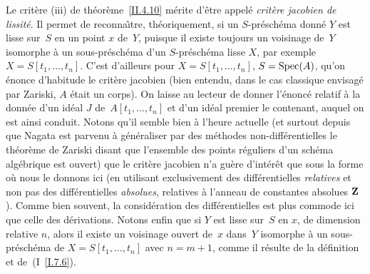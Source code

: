 \begin{remarques}
\label{II.4.14}
Le crit\`ere (iii) de th\'eor\`eme~\ref{II.4.10} m\'erite
d'\^etre appel\'e \emph{critère jacobien de lissité}.
Il permet de reconna\^{\i}tre, th\'eoriquement, si un
$S$-pr\'esch\'ema donn\'e $Y$ est lisse sur~$S$ en un point $x$
de~$Y$, puisque il existe toujours un voisinage de~$Y$ isomorphe \`a
un sous-pr\'esch\'ema d'un $S$-pr\'esch\'ema lisse $X$, par
exemple $X=S[t_1,\dots,t_n]$. C'est d'ailleurs pour
$X=S[t_1,\dots,t_n]$, $S=\operatorname{Spec}(A)$, qu'on \'enonce d'habitude le
crit\`ere jacobien (bien
entendu, dans le cas classique envisag\'e par Zariski, $A$ \'etait
un corps). On laisse au lecteur de donner l'\'enonc\'e relatif
\`a la donn\'ee d'un id\'eal $J$ de~$A[t_1,\dots,t_n]$ et d'un
id\'eal premier le contenant, auquel on est ainsi conduit. Notons
qu'il semble bien \`a l'heure actuelle (et surtout depuis que Nagata
est parvenu \`a g\'en\'eraliser par des m\'ethodes
non-diff\'erentielles le th\'eor\`eme de Zariski disant que
l'ensemble des points r\'eguliers d'un sch\'ema alg\'ebrique est
ouvert) que le crit\`ere jacobien n'a gu\`ere d'int\'er\^et
que sous la forme o\`u nous le donnons ici (\ie en utilisant
exclusivement des diff\'erentielles \emph{relatives} et non pas des
diff\'erentielles \emph{absolues}, \ie relatives \`a l'anneau de
constantes absolues $\mathbf{Z}$). Comme bien souvent, la consid\'eration
des diff\'erentielles est plus commode ici que celle des
d\'erivations. Notons enfin que si $Y$ est lisse sur~$S$ en $x$, de
dimension relative $n$, alors il existe un voisinage ouvert de~$x$
dans~$Y$ isomorphe \`a un sous-pr\'esch\'ema de
$X=S[t_1,\dots,t_n]$ avec $n=m+1$, comme il r\'esulte de la
d\'efinition et
de~(I~\ref{I.7.6}).


\end{remarques}
